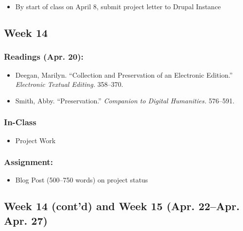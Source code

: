 \documentclass[]{article}
\begin{document}
\begin{itemize}
\itemsep1pt\parskip0pt
\item
  By start of class on April 8, submit project letter to Drupal Instance
\end{itemize}

\subsection{Week 14}\label{week-14}

\subsubsection{Readings (Apr. 20):}\label{readings-apr.-20}

\begin{itemize}
\itemsep1pt\parskip0pt
\item
  Deegan, Marilyn. ``Collection and Preservation of an Electronic
  Edition.'' \emph{Electronic Textual Editing.} 358--370.
\item
  Smith, Abby. ``Preservation.'' \emph{Companion to Digital Humanities.}
  576--591.
\end{itemize}

\subsubsection{In-Class}\label{in-class-1}

\begin{itemize}
\itemsep1pt\parskip0pt
\item
  Project Work
\end{itemize}

\subsubsection{Assignment:}\label{assignment-2}

\begin{itemize}
\itemsep1pt\parskip0pt
\item
  Blog Post (500--750 words) on project status
\end{itemize}

\subsection{Week 14 (cont'd) and Week 15 (Apr. 22--Apr. Apr.
27)}\label{week-14-contd-and-week-15-apr.-22apr.-apr.-27}
\end{document}
